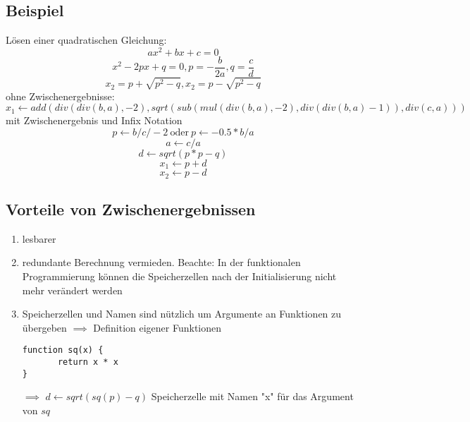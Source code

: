 \documentclass[a4paper]{scrartcl}
\theoremstyle{definition}
\theoremstyle{plain}
\theoremstyle{remark}
\theoremstyle{remark}
\begin{document}
\subsection{Beispiel}
\label{sec-6-1}
Lösen einer quadratischen Gleichung:
\[ax^2 + bx + c = 0\]
\[x^2 - 2px + q = 0, p = -\frac{b}{2a},q=\frac{c}{d}\]
\[x_2 = p + \sqrt{p^2 - q},x_2 = p - \sqrt{p^2 - q}\]
ohne Zwischenergebnisse:
\[x_1 \leftarrow add(div(div(b,a),-2),sqrt(sub(mul(div(b,a),-2),div(div(b,a)-1)),div(c,a)))\]
mit Zwischenergebnis und Infix Notation
\[p\leftarrow b / c / -2~\text{oder}~p\leftarrow -0.5 * b / a\]
\[a\leftarrow c / a\]
\[d\leftarrow sqrt(p*p - q)\]
\[x_1\leftarrow p + d\]
\[x_2\leftarrow p - d\]
\subsection{Vorteile von Zwischenergebnissen}
\label{sec-6-2}
\begin{enumerate}
\item lesbarer
\item redundante Berechnung vermieden. Beachte: In der funktionalen Programmierung können die Speicherzellen nach der Initialisierung nicht mehr verändert werden
\item Speicherzellen und Namen sind nützlich um Argumente an Funktionen zu übergeben $\implies$ Definition eigener Funktionen
\begin{verbatim}
function sq(x) {
       return x * x
}
\end{verbatim}
$\implies$ $d \leftarrow sqrt(sq(p) - q)$
Speicherzelle mit Namen "x" für das Argument von $sq$
\end{enumerate}
\end{document}

